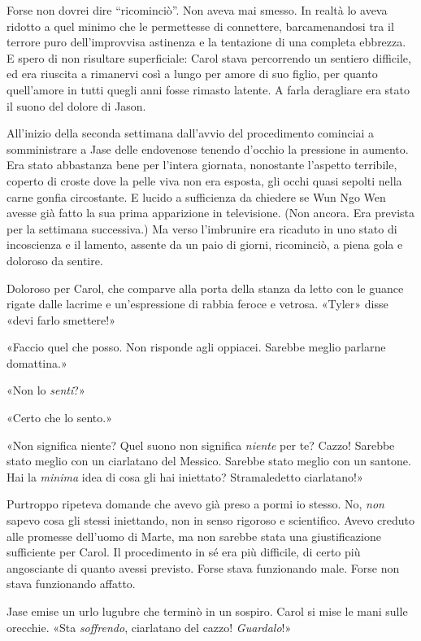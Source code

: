 Forse non dovrei dire ``ricominciò''. Non aveva mai smesso. In realtà lo
aveva ridotto a quel minimo che le permettesse di connettere,
barcamenandosi tra il terrore puro dell'improvvisa astinenza e la
tentazione di una completa ebbrezza. E spero di non risultare
superficiale: Carol stava percorrendo un sentiero difficile, ed era
riuscita a rimanervi così a lungo per amore di suo figlio, per quanto
quell'amore in tutti quegli anni fosse rimasto latente. A farla
deragliare era stato il suono del dolore di Jason.

All'inizio della seconda settimana dall'avvio del procedimento cominciai
a somministrare a Jase delle endovenose tenendo d'occhio la pressione in
aumento. Era stato abbastanza bene per l'intera giornata, nonostante
l'aspetto terribile, coperto di croste dove la pelle viva non era
esposta, gli occhi quasi sepolti nella carne gonfia circostante. E
lucido a sufficienza da chiedere se Wun Ngo Wen avesse già fatto la sua
prima apparizione in televisione. (Non ancora. Era prevista per la
settimana successiva.) Ma verso l'imbrunire era ricaduto in uno stato di
incoscienza e il lamento, assente da un paio di giorni, ricominciò, a
piena gola e doloroso da sentire.

Doloroso per Carol, che comparve alla porta della stanza da letto con le
guance rigate dalle lacrime e un'espressione di rabbia feroce e vetrosa.
«Tyler» disse «devi farlo smettere!»

«Faccio quel che posso. Non risponde agli oppiacei. Sarebbe meglio
parlarne domattina.»

«Non lo \emph{senti}?»

«Certo che lo sento.»

«Non significa niente? Quel suono non significa \emph{niente} per te?
Cazzo! Sarebbe stato meglio con un ciarlatano del Messico. Sarebbe stato
meglio con un santone. Hai la \emph{minima} idea di cosa gli hai
iniettato? Stramaledetto ciarlatano!»

Purtroppo ripeteva domande che avevo già preso a pormi io stesso. No,
\emph{non} sapevo cosa gli stessi iniettando, non in senso rigoroso e
scientifico. Avevo creduto alle promesse dell'uomo di Marte, ma non
sarebbe stata una giustificazione sufficiente per Carol. Il procedimento
in sé era più difficile, di certo più angosciante di quanto avessi
previsto. Forse stava funzionando male. Forse non stava funzionando
affatto.

Jase emise un urlo lugubre che terminò in un sospiro. Carol si mise le
mani sulle orecchie. «Sta \emph{soffrendo}, ciarlatano del cazzo!
\emph{Guardalo}!»

